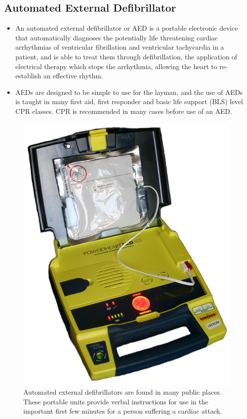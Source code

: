 \documentclass[12pt]{book}
\begin{document}
\subsection{Automated External Defibrillator}
\begin{itemize}

	\item An automated external defibrillator or AED is a portable electronic
device that automatically diagnoses the potentially life threatening
cardiac arrhythmias of ventricular fibrillation and ventricular
tachycardia in a patient, and is able to treat them through defibrillation,
the application of electrical therapy which stops the arrhythmia,
allowing the heart to re-establish an effective rhythm.
\item  AEDs are
designed to be simple to use for the layman, and the use of AEDs
is taught in many first aid, first responder and basic life support (BLS)
level CPR classes. CPR is recommended in many cases before use of an AED.

\end{itemize}
\begin{figure}[H]
\includegraphics[scale=0.55]{aed.jpeg}
\centering
\caption{Automated external defibrillators are found in many public places. These portable units provide verbal instructions for use in the important first few minutes for a person suffering a cardiac attack.}
\end{figure}
\end{document}
